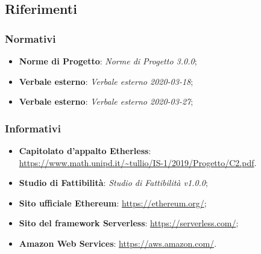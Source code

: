 \subsection{Riferimenti}
\subsubsection{Normativi}
\begin{itemize}
	\item \textbf{Norme di Progetto}: \textit{Norme di Progetto 3.0.0};
	\item \textbf{Verbale esterno}: \textit{Verbale esterno 2020-03-18};
	\item \textbf{Verbale esterno}: \textit{Verbale esterno 2020-03-27};
\end{itemize}

\subsubsection{Informativi}
\begin{itemize}
	\item \textbf{Capitolato d'appalto Etherless}:\\\url{https://www.math.unipd.it/~tullio/IS-1/2019/Progetto/C2.pdf}.
	\item \textbf{Studio di Fattibilità}: \textit{Studio di Fattibilità v1.0.0};
	\item \textbf{Sito ufficiale Ethereum}: \url{https://ethereum.org/};
	\item \textbf{Sito del framework Serverless}: \url{https://serverless.com/};
	\item \textbf{Amazon Web Services}: \url{https://aws.amazon.com/}.
\end{itemize}